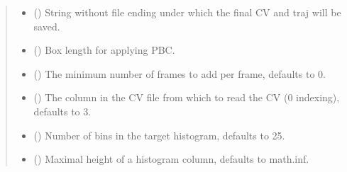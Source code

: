 \documentclass[a4paper,10pt,english]{report}
\begin{document}
\begin{fulllineitems}
\begin{quote}
\begin{description}
\begin{itemize}
\item {} 
\sphinxAtStartPar
{} () \textendash{} String without file ending under which the final CV and traj will be saved.

\item {} 
\sphinxAtStartPar
{} () \textendash{} Box length for applying PBC.

\item {} 
\sphinxAtStartPar
{} (\sphinxstyleliteralemphasis{\sphinxupquote{, }}) \textendash{} The minimum number of frames to add per frame, defaults to 0.

\item {} 
\sphinxAtStartPar
{} (\sphinxstyleliteralemphasis{\sphinxupquote{, }}) \textendash{} The column in the CV file from which to read the CV (0 indexing), defaults to 3.

\item {} 
\sphinxAtStartPar
{} (\sphinxstyleliteralemphasis{\sphinxupquote{, }}) \textendash{} Number of bins in the target histogram, defaults to 25.

\item {} 
\sphinxAtStartPar
{} (\sphinxstyleliteralemphasis{\sphinxupquote{, }}) \textendash{} Maximal height of a histogram column, defaults to math.inf.

\end{itemize}

\end{description}\end{quote}

\end{fulllineitems}

\end{document}
